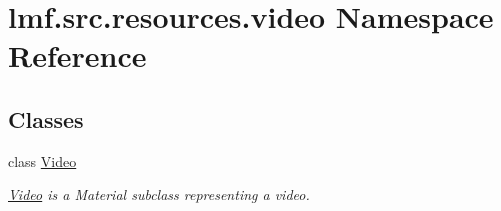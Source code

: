 \hypertarget{namespacelmf_1_1src_1_1resources_1_1video}{\section{lmf.\+src.\+resources.\+video Namespace Reference}
\label{namespacelmf_1_1src_1_1resources_1_1video}
}
\subsection*{Classes}
\begin{DoxyCompactItemize}
\item 
class \hyperlink{classlmf_1_1src_1_1resources_1_1video_1_1_video}{Video}
\begin{DoxyCompactList}\small\item\em \hyperlink{classlmf_1_1src_1_1resources_1_1video_1_1_video}{Video} is a Material subclass representing a video. \end{DoxyCompactList}\end{DoxyCompactItemize}
